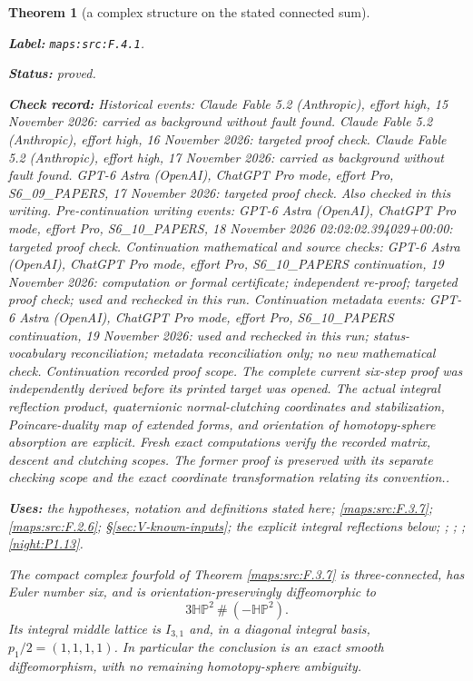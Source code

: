 \documentclass[11pt,a4paper]{article}
\newtheorem{theorem}{Theorem}[section]
\theoremstyle{definition}
\newcommand{\StatementRecord}[4]{\par\smallskip\begingroup\upshape\raggedright\noindent\textbf{Label:} \nolinkurl{#1}.\par\noindent\textbf{Status:} #2.\par\noindent\textbf{Check record:} #3.\par\noindent\textbf{Uses:} #4.\par\endgroup\smallskip}
\begin{document}
\begin{theorem}[a complex structure on the stated connected sum]\label{maps:src:F.4.1}
\StatementRecord{maps:src:F.4.1}{proved}{Historical events: Claude Fable 5.2 (Anthropic), effort high, 15 November 2026: carried as background without fault found. Claude Fable 5.2 (Anthropic), effort high, 16 November 2026: targeted proof check. Claude Fable 5.2 (Anthropic), effort high, 17 November 2026: carried as background without fault found. GPT-6 Astra (OpenAI), ChatGPT Pro mode, effort Pro, S6\_09\_PAPERS, 17 November 2026: targeted proof check. Also checked in this writing. Pre-continuation writing events: GPT-6 Astra (OpenAI), ChatGPT Pro mode, effort Pro, S6\_10\_PAPERS, 18 November 2026 02:02:02.394029+00:00: targeted proof check. Continuation mathematical and source checks: GPT-6 Astra (OpenAI), ChatGPT Pro mode, effort Pro, S6\_10\_PAPERS continuation, 19 November 2026: computation or formal certificate; independent re-proof; targeted proof check; used and rechecked in this run. Continuation metadata events: GPT-6 Astra (OpenAI), ChatGPT Pro mode, effort Pro, S6\_10\_PAPERS continuation, 19 November 2026: used and rechecked in this run; status-vocabulary reconciliation; metadata reconciliation only; no new mathematical check. \emph{Continuation recorded proof scope.} The complete current six-step proof was independently derived before its printed target was opened. The actual integral reflection product, quaternionic normal-clutching coordinates and stabilization, Poincare-duality map of extended forms, and orientation of homotopy-sphere absorption are explicit. Fresh exact computations verify the recorded matrix, descent and clutching scopes. The former proof is preserved with its separate checking scope and the exact coordinate transformation relating its convention.}{the hypotheses, notation and definitions stated here; \cref{maps:src:F.3.7}; \cref{maps:src:F.2.6}; \S\ref{sec:V-known-inputs}; the explicit integral reflections below; \cite[Corollary 1.4, p.~4]{ffMandal}; \cite[Definition 3.6 and Theorem 3.7(1), pp.~12--14]{IVVWallForm}; \cite[Theorem A, p.~178]{IVVKramerStolz}; \cref{night:P1.13}}


The compact complex fourfold of Theorem \ref{maps:src:F.3.7} is three-connected,
has Euler number six, and is orientation-preservingly diffeomorphic to
\[
 3\mathbb H\mathbb P^2\ \#\ (-\mathbb H\mathbb P^2).
 \tag{F.25}\label{maps:eq:F.25}
\]
Its integral middle lattice is $I_{3,1}$ and, in a diagonal integral
basis, $p_1/2=(1,1,1,1)$.  In particular the conclusion is an exact
smooth diffeomorphism, with no remaining homotopy-sphere ambiguity.

\end{theorem}
\end{document}
